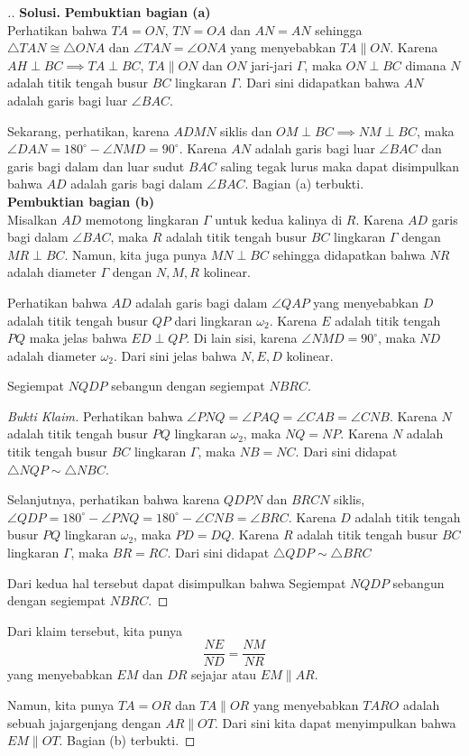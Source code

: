 \documentclass[12pt]{scrartcl}
\begin{document}
\begin{proof}[.]
\newpage
\textbf{Solusi.}
\textbf{Pembuktian bagian (a)}\\
Perhatikan bahwa $TA=ON$, $TN=OA$ dan $AN=AN$ sehingga $\triangle TAN \cong \triangle ONA$ dan $\angle TAN = \angle ONA$ yang menyebabkan $TA \parallel ON$. Karena $AH \perp BC \implies TA \perp BC$, $TA \parallel ON$ dan $ON$ jari-jari $\Gamma$, maka  $ON \perp BC$ dimana $N$ adalah titik tengah busur $BC$ lingkaran $\Gamma$. Dari sini didapatkan bahwa $AN$ adalah garis bagi luar $\angle BAC$.

Sekarang, perhatikan, karena $ADMN$ siklis dan $OM \perp BC \implies NM \perp BC$, maka $\angle DAN = 180^\circ - \angle NMD = 90^\circ$. Karena $AN$ adalah garis bagi luar $\angle BAC$ dan garis bagi dalam dan luar sudut $BAC$ saling tegak lurus maka dapat disimpulkan bahwa $AD$ adalah garis bagi dalam $\angle BAC$. Bagian (a) terbukti.\\

\textbf{Pembuktian bagian (b)}\\
Misalkan $AD$ memotong lingkaran $\Gamma$ untuk kedua kalinya di $R$. Karena $AD$ garis bagi dalam $\angle BAC$, maka $R$ adalah titik tengah busur $BC$ lingkaran $\Gamma$ dengan $MR \perp BC$. Namun, kita juga punya $MN \perp BC$ sehingga didapatkan bahwa $NR$ adalah diameter $\Gamma$ dengan $N,M,R$ kolinear.

Perhatikan bahwa $AD$ adalah garis bagi dalam $\angle QAP$ yang menyebabkan $D$ adalah titik tengah busur $QP$ dari lingkaran $\omega_2$. Karena $E$ adalah titik tengah $PQ$ maka jelas bahwa $ED \perp QP$. Di lain sisi, karena $\angle NMD = 90^\circ$, maka $ND$ adalah diameter $\omega_2$. Dari sini jelas bahwa $N, E, D$ kolinear.\\

\begin{claim*}
Segiempat $NQDP$ sebangun dengan segiempat $NBRC$.
\end{claim*}
\begin{proof}[Bukti Klaim]
Perhatikan bahwa $\angle PNQ = \angle PAQ = \angle CAB = \angle CNB$. Karena $N$ adalah titik tengah busur $PQ$ lingkaran $\omega_2$, maka $NQ = NP$. Karena $N$ adalah titik tengah busur $BC$ lingkaran $\Gamma$, maka $NB = NC$. Dari sini didapat $\triangle NQP \sim \triangle NBC$. 

Selanjutnya, perhatikan bahwa karena $QDPN$ dan $BRCN$ siklis, $\angle QDP = 180^\circ - \angle PNQ = 180^\circ - \angle CNB = \angle BRC$. Karena $D$ adalah titik tengah busur $PQ$ lingkaran $\omega_2$, maka $PD=DQ$. Karena $R$ adalah titik tengah busur $BC$ lingkaran $\Gamma$, maka $BR=RC$. Dari sini didapat $\triangle QDP \sim \triangle BRC$

Dari kedua hal tersebut dapat disimpulkan bahwa Segiempat $NQDP$ sebangun dengan segiempat $NBRC$.\end{proof}

Dari klaim tersebut, kita punya 
\[\dfrac{NE}{ND} = \dfrac{NM}{NR}\]
yang menyebabkan $EM$ dan $DR$ sejajar atau $EM \parallel AR$.

Namun, kita punya $TA=OR$ dan $TA \parallel OR$ yang menyebabkan $TARO$ adalah sebuah jajargenjang dengan $AR \parallel OT$. Dari sini kita dapat menyimpulkan bahwa $EM \parallel OT$. Bagian (b) terbukti.
\end{proof}
\end{document}

